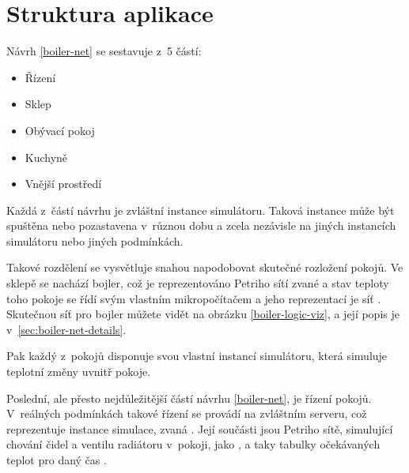 \section{Struktura aplikace}

Návrh \ref{boiler-net} se sestavuje z~5 částí:
\begin{itemize}
 \item Řízení
 \item Sklep
 \item Obývací pokoj
 \item Kuchyně
 \item Vnější prostředí
\end{itemize}
Každá z~částí návrhu je zvláštní instance simulátoru. Taková instance může být spuštěna nebo pozastavena v~různou dobu a zcela nezávisle na jiných instancích simulátoru nebo jiných podmínkách.

Takové rozdělení se vysvětluje snahou napodobovat skutečné rozložení pokojů. Ve sklepě se nachází bojler, což je reprezentováno Petriho sítí zvané  a stav teploty toho pokoje se řídí svým vlastním mikropočítačem a jeho reprezentací je síť . Skutečnou síť pro bojler můžete vidět na obrázku \ref{boiler-logic-viz}, a její popis je v~\ref{sec:boiler-net-details}.

Pak každý z~pokojů disponuje svou vlastní instancí simulátoru, která simuluje teplotní změny uvnitř pokoje.

Poslední, ale přesto nejdůležitější částí návrhu \ref{boiler-net}, je řízení pokojů. V~reálných podmínkách takové řízení se provádí na zvláštním serveru, což reprezentuje instance simulace, zvaná . Její součásti jsou Petriho sítě, simulující chování čidel a ventilu radiátoru v~pokoji, jako , a taky tabulky očekávaných teplot pro daný čas .

